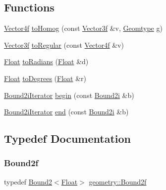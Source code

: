 \subsection*{Functions}
\begin{DoxyCompactItemize}
\item 
\mbox{\hyperlink{cyclop_8hpp_ac277e3b99e79f681e1e8b633243a9abf}{Vector4f}} \mbox{\hyperlink{namespacegeometry_a2550fb39f65597df7df21efac9e8a130}{to\+Homog}} (const \mbox{\hyperlink{cyclop_8hpp_a5a0a2e85b081623ef3f7e7e8d43024f5}{Vector3f}} \&v, \mbox{\hyperlink{cyclop_8hpp_a2317999143a1598860004551163419b5}{Geomtype}} g)
\item 
\mbox{\hyperlink{cyclop_8hpp_a5a0a2e85b081623ef3f7e7e8d43024f5}{Vector3f}} \mbox{\hyperlink{namespacegeometry_ad9a8fab54d9961dad62363d46d8e864c}{to\+Regular}} (const \mbox{\hyperlink{cyclop_8hpp_ac277e3b99e79f681e1e8b633243a9abf}{Vector4f}} \&v)
\item 
\mbox{\hyperlink{cyclop_8hpp_a07afd7094cb489cbd514c76e6f55d34f}{Float}} \mbox{\hyperlink{namespacegeometry_a762bd0745396732f10b428ed2bf1a9c5}{to\+Radians}} (\mbox{\hyperlink{cyclop_8hpp_a07afd7094cb489cbd514c76e6f55d34f}{Float}} \&d)
\item 
\mbox{\hyperlink{cyclop_8hpp_a07afd7094cb489cbd514c76e6f55d34f}{Float}} \mbox{\hyperlink{namespacegeometry_a06c175e49959597cbc93635c41ecbf98}{to\+Degrees}} (\mbox{\hyperlink{cyclop_8hpp_a07afd7094cb489cbd514c76e6f55d34f}{Float}} \&r)
\item 
\mbox{\hyperlink{classgeometry_1_1Bound2iIterator}{Bound2i\+Iterator}} \mbox{\hyperlink{namespacegeometry_ae6b3b3a9d89687f2a7b462c3988215b4}{begin}} (const \mbox{\hyperlink{namespacegeometry_a918a919c0a947983a121b11e5c64934f}{Bound2i}} \&b)
\item 
\mbox{\hyperlink{classgeometry_1_1Bound2iIterator}{Bound2i\+Iterator}} \mbox{\hyperlink{namespacegeometry_a7a69deaf127e8c263b56d8a4f2ce4a11}{end}} (const \mbox{\hyperlink{namespacegeometry_a918a919c0a947983a121b11e5c64934f}{Bound2i}} \&b)
\end{DoxyCompactItemize}


\subsection{Typedef Documentation}
\mbox{\label{namespacegeometry_ac3fecada9e2f601d3fbf32fd5962858f}} 
\subsubsection{\texorpdfstring{Bound2f}{Bound2f}}
{\footnotesize\ttfamily typedef \mbox{\hyperlink{classgeometry_1_1Bound2}{Bound2}}$<$\mbox{\hyperlink{cyclop_8hpp_a07afd7094cb489cbd514c76e6f55d34f}{Float}}$>$ \mbox{\hyperlink{namespacegeometry_ac3fecada9e2f601d3fbf32fd5962858f}{geometry\+::\+Bound2f}}}

